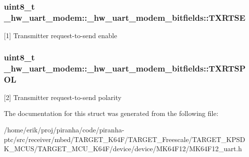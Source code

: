 \subsubsection[{\texorpdfstring{T\+X\+R\+T\+SE}{TXRTSE}}]{\setlength{\rightskip}{0pt plus 5cm}uint8\+\_\+t \+\_\+hw\+\_\+uart\+\_\+modem\+::\+\_\+hw\+\_\+uart\+\_\+modem\+\_\+bitfields\+::\+T\+X\+R\+T\+SE}\hypertarget{struct__hw__uart__modem_1_1__hw__uart__modem__bitfields_a1ded33c482607d8d8a9c0ea2948240ea}{}\label{struct__hw__uart__modem_1_1__hw__uart__modem__bitfields_a1ded33c482607d8d8a9c0ea2948240ea}
\mbox{[}1\mbox{]} Transmitter request-\/to-\/send enable 
\subsubsection[{\texorpdfstring{T\+X\+R\+T\+S\+P\+OL}{TXRTSPOL}}]{\setlength{\rightskip}{0pt plus 5cm}uint8\+\_\+t \+\_\+hw\+\_\+uart\+\_\+modem\+::\+\_\+hw\+\_\+uart\+\_\+modem\+\_\+bitfields\+::\+T\+X\+R\+T\+S\+P\+OL}\hypertarget{struct__hw__uart__modem_1_1__hw__uart__modem__bitfields_ac1a913c423fede161d30c6619c122b00}{}\label{struct__hw__uart__modem_1_1__hw__uart__modem__bitfields_ac1a913c423fede161d30c6619c122b00}
\mbox{[}2\mbox{]} Transmitter request-\/to-\/send polarity 

The documentation for this struct was generated from the following file\+:\begin{DoxyCompactItemize}
\item 
/home/erik/proj/piranha/code/piranha-\/ptc/src/receiver/mbed/\+T\+A\+R\+G\+E\+T\+\_\+\+K64\+F/\+T\+A\+R\+G\+E\+T\+\_\+\+Freescale/\+T\+A\+R\+G\+E\+T\+\_\+\+K\+P\+S\+D\+K\+\_\+\+M\+C\+U\+S/\+T\+A\+R\+G\+E\+T\+\_\+\+M\+C\+U\+\_\+\+K64\+F/device/device/\+M\+K64\+F12/M\+K64\+F12\+\_\+uart.\+h\end{DoxyCompactItemize}
